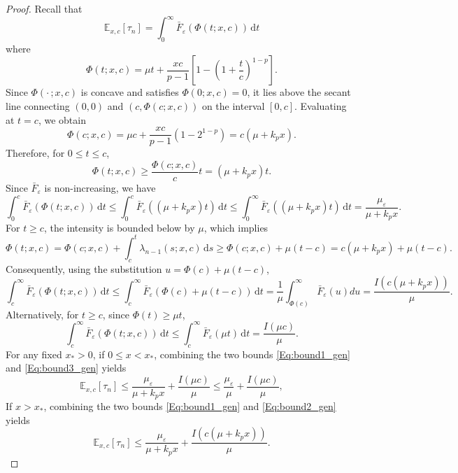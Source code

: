 \documentclass[11pt]{article}
\newcommand{\D}{\mathrm{d}}
\theoremstyle{definition}
\begin{document}
\begin{proof}
	Recall that
	\[
	\mathbb E_{x,c}[\tau_n]
	=
	\int_0^\infty \bar{F}_{\varepsilon}(\Phi(t;x,c))\, \D t
	\]
	where
	\[
	\Phi(t;x,c)
	=
	\mu t
	+
	\frac{x c}{p-1}
	\left[
	1-\left(1+\frac{t}{c}\right)^{1-p}
	\right].
	\]
	Since \(\Phi(\cdot\,;x,c)\) is concave and satisfies \(\Phi(0;x,c)=0\), it lies above the secant line connecting \((0,0)\) and \((c,\Phi(c;x,c))\) on the interval \([0,c]\).
	Evaluating at \(t=c\), we obtain
	\[
	\Phi(c;x,c) = \mu c + \frac{xc}{p-1}(1 - 2^{1-p}) = c(\mu + k_p x).
	\]
	Therefore, for \(0 \le t \le c\), 
	\begin{equation}
	\Phi(t;x,c) \ge \frac{\Phi(c;x,c)}{c} t = (\mu + k_p x)t. \label{Eq:Phi_B1}
	\end{equation}
	Since $\bar{F}_{\varepsilon}$ is non-increasing, we have
	\begin{equation}
		\int_0^c \bar{F}_{\varepsilon}(\Phi(t;x,c))\, \D t \le
		\int_0^c \bar{F}_{\varepsilon}((\mu+ k_p x)t)\, \D t \le \int_0^\infty \bar{F}_{\varepsilon}((\mu+ k_p x)t)\, \D t = \frac{\mu_{\varepsilon}}{\mu + k_p x}. \label{Eq:bound1_gen}
	\end{equation}
	For $t\ge c$, the intensity is bounded below by $\mu$, which implies
	\begin{equation}
	\Phi(t;x,c)
	=
	\Phi(c;x,c)+\int_c^t \lambda_{n-1}(s;x,c)\,\D s
	\ge
	\Phi(c;x,c)+\mu(t-c) = c(\mu + k_p x) + \mu(t-c). \label{Eq:Phi_B2}
	\end{equation}
	Consequently, using the substitution $u = \Phi(c) + \mu(t-c)$,
	\begin{equation}
		\int_c^\infty \bar{F}_{\varepsilon}(\Phi(t;x,c))\,\D t
		\le \int_c^\infty \bar{F}_{\varepsilon}(\Phi(c) + \mu(t-c))\,\D t = \frac{1}{\mu} \int_{\Phi(c)}^\infty \bar{F}_{\varepsilon}(u) du = \frac{I(c(\mu+k_p x))}{\mu}. \label{Eq:bound2_gen}
	\end{equation}
	Alternatively, for \(t \ge c\), since $\Phi(t) \ge \mu t$,
	\begin{equation}
		\int_c^\infty \bar{F}_{\varepsilon}(\Phi(t;x,c))\,\D t
		\le
		\int_c^\infty \bar{F}_{\varepsilon}(\mu t)\,\D t
		=
		\frac{I(\mu c)}{\mu}. \label{Eq:bound3_gen}
	\end{equation}
	For any fixed $x_*>0$, if $0\le x<x_*$, 
	combining the two bounds \eqref{Eq:bound1_gen} and \eqref{Eq:bound3_gen} 
	yields
	\[
	\mathbb E_{x,c}[\tau_n]
	\le \frac{\mu_{\varepsilon}}{\mu + k_p x} + \frac{I(\mu c)}{\mu} \le
	\frac{\mu_{\varepsilon}}{\mu} + \frac{I(\mu c)}{\mu},
	\]
	If $x > x_*$, combining the two bounds \eqref{Eq:bound1_gen} and \eqref{Eq:bound2_gen} 
	yields
	\[
	\mathbb E_{x,c}[\tau_n]
	\le
	\frac{\mu_{\varepsilon}}{\mu+ k_p x} + \frac{I(c(\mu+k_p x))}{\mu}.
	\]
\end{proof}
\end{document}
